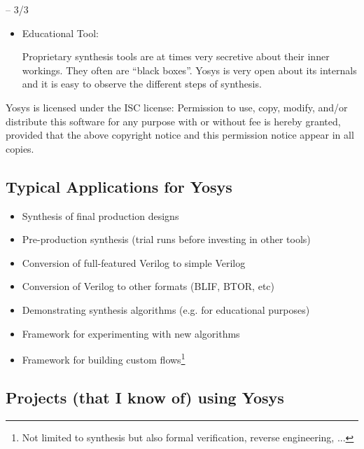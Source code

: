 \begin{frame}{\subsecname{} -- 3/3}
\begin{itemize}
\item Educational Tool: \smallskip\par
Proprietary synthesis tools are at times very secretive about their inner
workings. They often are ``black boxes''. Yosys is very open about its
internals and it is easy to observe the different steps of synthesis.
\end{itemize}

\bigskip
\begin{block}{Yosys is licensed under the ISC license:}
Permission to use, copy, modify, and/or distribute this software for any
purpose with or without fee is hereby granted, provided that the above
copyright notice and this permission notice appear in all copies.
\end{block}
\end{frame}


\subsection{Typical Applications for Yosys}

\begin{frame}{\subsecname}
\begin{itemize}
\item Synthesis of final production designs
\item Pre-production synthesis (trial runs before investing in other tools)
\item Conversion of full-featured Verilog to simple Verilog
\item Conversion of Verilog to other formats (BLIF, BTOR, etc)
\item Demonstrating synthesis algorithms (e.g. for educational purposes)
\item Framework for experimenting with new algorithms
\item Framework for building custom flows\footnote[frame]{Not limited to synthesis
but also formal verification, reverse engineering, ...}
\end{itemize}
\end{frame}


\subsection{Projects (that I know of) using Yosys}

